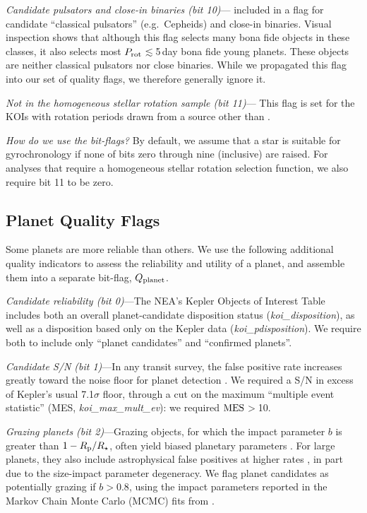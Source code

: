 \documentclass[11pt,twocolumn,tighten]{aastex63}
\begin{document}
{\it Candidate pulsators and close-in binaries (bit
10)}---\citeauthor{Santos_2021} included in a flag for candidate
``classical pulsators'' (e.g.\ Cepheids) and close-in binaries.
Visual inspection shows that although this flag selects many bona fide
objects in these classes, it also selects most $P_{\rm
rot}$$\lesssim$5\,day bona fide young planets.  These objects are
neither classical pulsators nor close binaries.  While we propagated
this flag into our set of quality flags, we therefore generally ignore
it.

{\it Not in the homogeneous stellar rotation sample (bit 11)}--- This
flag is set for the KOIs with rotation periods drawn from a source
other than \citet{Santos_2019,Santos_2021}.


{\it How do we use the bit-flags?} By default, we assume that a star
is suitable for gyrochronology if none of bits zero through nine
(inclusive) are raised.  For analyses that require a homogeneous
stellar rotation selection function, we also require bit 11 to be
zero. 


\subsection{Planet Quality Flags}
\label{subsec:plflags}
Some planets are more reliable than others.  We use the following
additional quality indicators to assess the reliability and utility of
a planet, and assemble them into a separate bit-flag, $Q_{\rm
planet}$.

{\it Candidate reliability (bit 0)}---The NEA's Kepler Objects of
Interest Table includes both an overall planet-candidate disposition
status ({\it koi\_disposition}), as well as a disposition based only
on the Kepler data ({\it koi\_pdisposition}).  We require both to
include only ``planet candidates'' and ``confirmed planets''. 

{\it Candidate S/N (bit 1)}---In any transit survey, the false
positive rate increases greatly toward the noise floor for planet
detection \citep[e.g.][]{2002ApJ...564..495J}.  We required a S/N in
excess of Kepler's usual 7.1$\sigma$ floor, through a cut on the
maximum ``multiple event statistic'' (MES, {\it koi\_max\_mult\_ev}):
we required ${\rm MES}$$>$10.

{\it Grazing planets (bit 2)}---Grazing objects, for which the impact
parameter $b$ is greater than $1-R_{\rm p}/R_\star$, often yield
biased planetary parameters \citep[e.g.][]{2022AJ....163..111G}.  For
large planets, they also include astrophysical false positives at
higher rates \citep{2016ApJ...822...86M}, in part due to the
size-impact parameter degeneracy.  We flag planet candidates as
potentially grazing if $b>0.8$, using the impact parameters reported
in the Markov Chain Monte Carlo (MCMC) fits from
\citet{Thompson_2018}.
\end{document}
